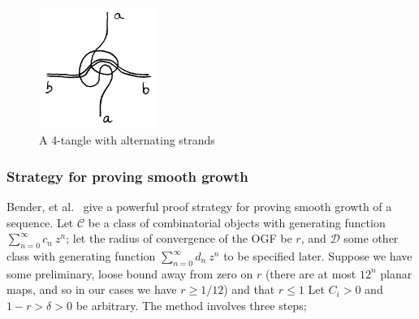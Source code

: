 \documentclass[amsmath,longbibliography,secnumarabic,floatfix,amssymb,nofootinbib,nobibnotes,letterpaper,11pt,notitlepage,preprint]{revtex4-1}
\newcommand{\ArbClass}{\mathscr{C}}
\newcommand{\ArbSubClass}{\mathscr{D}}
\newcommand{\arbsubclass}{d}
\newcommand{\arbclass}{c}
\begin{document}
\begin{figure}[h!]  \centering
  \includegraphics[width=1.5in]{alt_4_tangle}
  \caption{A 4-tangle with alternating strands}
  \label{fig:alt4tangle}
\end{figure}

\subsubsection{Strategy for proving smooth growth}
\label{sec:smoothstratproof}

Bender, et al.\ \cite{Bender1992104} give a powerful proof strategy for proving smooth growth of a
sequence. Let $\ArbClass$ be a class of combinatorial objects with generating function
$\sum_{n=0}^{\infty}{\arbclass_n~z^n}$; let the radius of convergence of the OGF be $r$, and
$\ArbSubClass$ some other class with generating function
$\sum_{n=0}^{\infty}{\arbsubclass_n~z^n}$ to be specified later. Suppose we have some preliminary,
loose bound away from zero on $r$ (there are at most $12^n$ planar maps, and so in our cases we have
$r \ge 1/12$) and that $r \le 1$ Let $C_i > 0$ and $1-r>\delta>0$ be
arbitrary. The method involves three steps;
\end{document}
